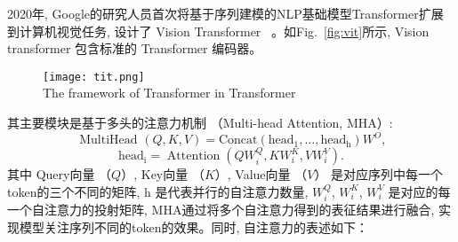 2020年, Google的研究人员首次将基于序列建模的NLP基础模型Transformer扩展到计算机视觉任务, 设计了 Vision Transformer~\cite{dosovitskiy2020image} 。如Fig.~\ref{fig:vit}所示, Vision transformer 包含标准的 Transformer 编码器。
\begin{figure}[!htp]
    \centering
    \texttt{[image: tit.png]} \\
      {The framework of  Transformer in Transformer}
   \label{fig:tit}
  \end{figure}
其主要模块是基于多头的注意力机制 （Multi-head Attention, MHA）:
\begin{equation}
    \text { MultiHead }(Q, K, V)=\text {Concat}\left(\text {head}_1, \ldots, \text {head}_{\mathrm{h}}\right) W^O,
\end{equation}
\begin{equation}
    \text {head}_{\mathrm{i}}=\operatorname{Attention}\left(Q W_i^Q, K W_i^K, V W_i^V\right).
\end{equation}
其中 Query向量 （$Q$）, Key向量 （$K$）, Value向量 （$V$） 是对应序列中每一个token的三个不同的矩阵, h 是代表并行的自注意力数量, $W_i^Q$, $W_i^K$, $W_i^V$ 是对应的每一个自注意力的投射矩阵, MHA通过将多个自注意力得到的表征结果进行融合, 实现模型关注序列不同的token的效果。同时, 自注意力的表述如下：

